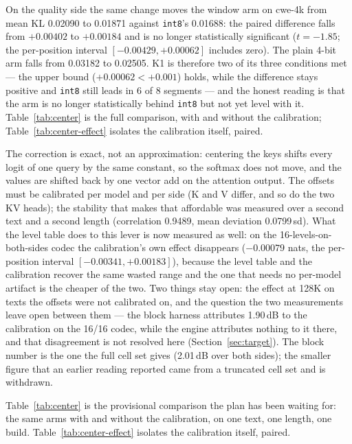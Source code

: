 \documentclass[10pt,twocolumn]{article}
\begin{document}
On the quality side the same change moves the window arm on cwe-4k from mean KL 0.02090 to 0.01871 against \texttt{int8}'s 0.01688: the paired difference falls from $+0.00402$ to $+0.00184$ and is no longer statistically significant ($t = -1.85$; the per-position interval $[-0.00429, +0.00062]$ includes zero). The plain 4-bit arm falls from 0.03182 to 0.02505. K1 is therefore two of its three conditions met --- the upper bound ($+0.00062 < +0.001$) holds, while the difference stays positive and \texttt{int8} still leads in 6 of 8 segments --- and the honest reading is that the arm is no longer statistically behind \texttt{int8} but not yet level with it. Table~\ref{tab:center} is the full comparison, with and without the calibration; Table~\ref{tab:center-effect} isolates the calibration itself, paired.

The correction is exact, not an approximation: centering the keys shifts every logit of one query by the same constant, so the softmax does not move, and the values are shifted back by one vector add on the attention output. The offsets must be calibrated per model and per side (K and V differ, and so do the two KV heads); the stability that makes that affordable was measured over a second text and a second length (correlation 0.9489, mean deviation 0.0799\,sd). What the level table does to this lever is now measured as well: on the 16-levels-on-both-sides codec the calibration's own effect disappears ($-0.00079$ nats, the per-position interval $[-0.00341, +0.00183]$), because the level table and the calibration recover the same wasted range and the one that needs no per-model artifact is the cheaper of the two. Two things stay open: the effect at 128K on texts the offsets were not calibrated on, and the question the two measurements leave open between them --- the block harness attributes 1.90\,dB to the calibration on the 16/16 codec, while the engine attributes nothing to it there, and that disagreement is not resolved here (Section~\ref{sec:target}). The block number is the one the full cell set gives (2.01\,dB over both sides); the smaller figure that an earlier reading reported came from a truncated cell set and is withdrawn.

Table~\ref{tab:center} is the provisional comparison the plan has been waiting for: the same arms with and without the calibration, on one text, one length, one build. Table~\ref{tab:center-effect} isolates the calibration itself, paired.
\end{document}
